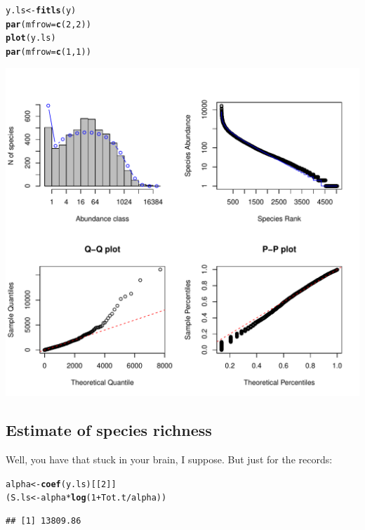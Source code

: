 \documentclass[12pt, A4]{article}\usepackage[]{graphicx}\usepackage[]{color}
\makeatletter
\def\maxwidth{ %
  \ifdim\Gin@nat@width>\linewidth
    \linewidth
  \else
    \Gin@nat@width
  \fi
}
\newcommand{\hlnum}[1]{\textcolor[rgb]{0.686,0.059,0.569}{#1}}%
\newcommand{\hlopt}[1]{\textcolor[rgb]{0,0,0}{#1}}%
\newcommand{\hlstd}[1]{\textcolor[rgb]{0.345,0.345,0.345}{#1}}%
\newcommand{\hlkwb}[1]{\textcolor[rgb]{0.69,0.353,0.396}{#1}}%
\newcommand{\hlkwc}[1]{\textcolor[rgb]{0.333,0.667,0.333}{#1}}%
\newcommand{\hlkwd}[1]{\textcolor[rgb]{0.737,0.353,0.396}{\textbf{#1}}}%
\newenvironment{kframe}{%
 \def\at@end@of@kframe{}%
 \ifinner\ifhmode%
  \def\at@end@of@kframe{\end{minipage}}%
  \begin{minipage}{\columnwidth}%
 \fi\fi%
 \def\FrameCommand##1{\hskip\@totalleftmargin \hskip-\fboxsep
 \colorbox{shadecolor}{##1}\hskip-\fboxsep
     \hskip-\linewidth \hskip-\@totalleftmargin \hskip\columnwidth}%
 \MakeFramed {\advance\hsize-\width
   \@totalleftmargin\z@ \linewidth\hsize
   \@setminipage}}%
 {\par\unskip\endMakeFramed%
 \at@end@of@kframe}
\newenvironment{knitrout}{}{} %
\makeatother
\begin{document}
 
\begin{knitrout}
\color{fgcolor}\begin{kframe}
\begin{alltt}
\hlstd{y.ls} \hlkwb{<-} \hlkwd{fitls}\hlstd{(y)}
\hlkwd{par}\hlstd{(}\hlkwc{mfrow}\hlstd{=}\hlkwd{c}\hlstd{(}\hlnum{2}\hlstd{,}\hlnum{2}\hlstd{))}
\hlkwd{plot}\hlstd{(y.ls)}
\hlkwd{par}\hlstd{(}\hlkwc{mfrow}\hlstd{=}\hlkwd{c}\hlstd{(}\hlnum{1}\hlstd{,}\hlnum{1}\hlstd{))}
\end{alltt}
\end{kframe}

{\centering \includegraphics[width=\maxwidth]{figure/fit_ls-1} 

}



\end{knitrout}

\subsection*{Estimate of species richness}

Well, you have that stuck in your brain, I suppose. 
But just for the records:

 
\begin{knitrout}
\color{fgcolor}\begin{kframe}
\begin{alltt}
\hlstd{alpha} \hlkwb{<-} \hlkwd{coef}\hlstd{(y.ls)[[}\hlnum{2}\hlstd{]]}
\hlstd{(S.ls} \hlkwb{<-} \hlstd{alpha}\hlopt{*}\hlkwd{log}\hlstd{(}\hlnum{1} \hlopt{+} \hlstd{Tot.t}\hlopt{/}\hlstd{alpha))}
\end{alltt}
\begin{verbatim}
## [1] 13809.86
\end{verbatim}
\end{kframe}
\end{knitrout}
\end{document}
